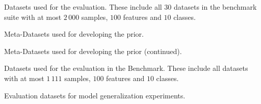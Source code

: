 \documentclass{article}
\begin{document}
\begin{table}[bt]
    \caption{Datasets used for the evaluation. These include all 30 datasets in the \openmlcc{} benchmark suite with at most $2\,000$ samples, $100$ features and $10$ classes.}
    \label{table:test_datasets_table}
    \centering
    \tiny
    
\end{table}

\begin{table}[bt]
    \centering
    \caption{Meta-Datasets used for developing the prior.}
    \tiny
    
    \label{table:reference_datasets_table}
\end{table}

\begin{table}[bt]
    \centering
    \caption{Meta-Datasets used for developing the prior (continued).}
    \tiny
    
    \label{table:reference_datasets_table_2}
\end{table}


\begin{table}[bt]
    \caption{Datasets used for the evaluation in the \openmlautoml{} Benchmark. These include all datasets with at most $1\,111$ samples, $100$ features and $10$ classes.}
    \label{table:automl_small_datasets}
    \centering
    \tiny
    
\end{table}

\begin{table}[bt]
    \centering
    \caption{Evaluation datasets for model generalization experiments.}
    \tiny
    
    \label{table:openml_datasets_table}
\end{table}
    
\end{document}
